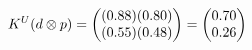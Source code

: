 \documentclass[preview]{standalone}
\begin{document}
\begin{align*}
\special{dvisvgm:raw <g id='unique000'>}K^U(d \otimes p) = \begin{pmatrix} (0.88)(0.80) \\ (0.55)(0.48) \end{pmatrix} = \begin{pmatrix} 0.70 \\ 0.26 \end{pmatrix}\special{dvisvgm:raw </g>}
\end{align*}
\end{document}
